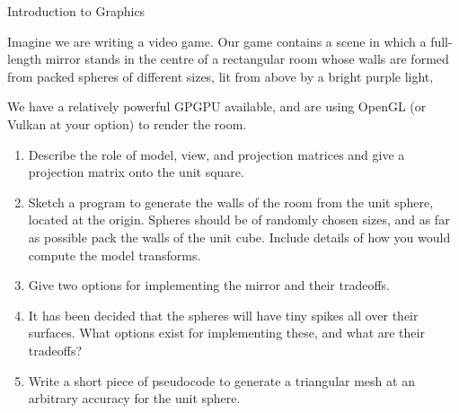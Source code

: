 \documentclass{tripos}  %
\begin{document}
\begin{question}[MockIA,year=2024,paper=1,question=5,author=rrw]{Introduction to Graphics}


Imagine we are writing a video game. Our game contains a scene in
which a full-length mirror stands in the centre of a rectangular room
whose walls are formed from packed spheres of different sizes, lit
from above by a bright purple light,

We have a relatively powerful GPGPU available, and are using OpenGL
(or Vulkan at your option) to render the room.

\begin{enumerate}
\item Describe the role of model, view, and projection matrices and give a projection matrix onto the unit square. 
\item Sketch a program to generate the walls of the room from the unit sphere, located at the origin. Spheres should be of randomly chosen sizes, and as far as possible pack the walls of the unit cube. Include details of how you would compute the model transforms. 
\item Give two options for implementing the mirror and their tradeoffs. 
\item It has been decided that the spheres will have tiny spikes all over their surfaces. What options exist for implementing these, and what are their tradeoffs? 
\item Write a short piece of pseudocode to generate a triangular mesh at an arbitrary accuracy for the unit sphere. 
\end{enumerate}

\end{question}
\end{document}
